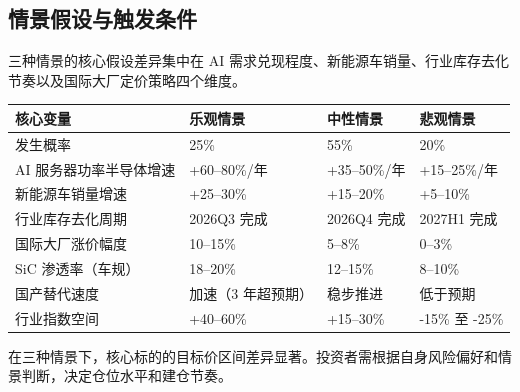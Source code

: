 \subsection{情景假设与触发条件}

三种情景的核心假设差异集中在 AI 需求兑现程度、新能源车销量、行业库存去化节奏以及国际大厂定价策略四个维度。

\begin{exhibitbox}[表 10-2：三情景核心假设对比]
\centering
\small
\begin{tabularx}{\textwidth}{L{2.8cm} L{3.8cm} L{3.8cm} L{3.8cm}}
\toprule
\textbf{核心变量} & \textbf{乐观情景} & \textbf{中性情景} & \textbf{悲观情景} \\
\midrule
发生概率 & 25\% & 55\% & 20\% \\
\midrule
AI 服务器功率半导体增速 & +60–80\%/年 & +35–50\%/年 & +15–25\%/年 \\
新能源车销量增速 & +25–30\% & +15–20\% & +5–10\% \\
行业库存去化周期 & 2026Q3 完成 & 2026Q4 完成 & 2027H1 完成 \\
国际大厂涨价幅度 & 10–15\% & 5–8\% & 0–3\% \\
SiC 渗透率（车规） & 18–20\% & 12–15\% & 8–10\% \\
国产替代速度 & 加速（3 年超预期） & 稳步推进 & 低于预期 \\
\midrule
行业指数空间 & +40–60\% & +15–30\% & -15\% 至 -25\% \\
\bottomrule
\end{tabularx}
\end{exhibitbox}

在三种情景下，核心标的的目标价区间差异显著。投资者需根据自身风险偏好和情景判断，决定仓位水平和建仓节奏。

